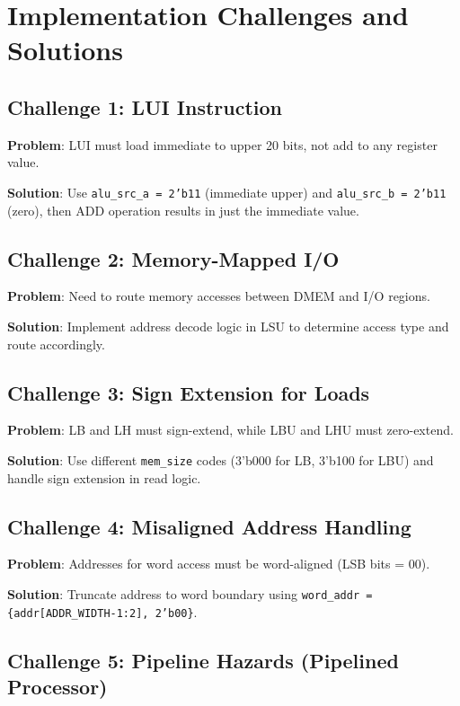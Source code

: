 \section{Implementation Challenges and Solutions}

\subsection{Challenge 1: LUI Instruction}

\textbf{Problem}: LUI must load immediate to upper 20 bits, not add to any register value.

\textbf{Solution}: Use \texttt{alu\_src\_a = 2'b11} (immediate upper) and \texttt{alu\_src\_b = 2'b11} (zero), then ADD operation results in just the immediate value.

\subsection{Challenge 2: Memory-Mapped I/O}

\textbf{Problem}: Need to route memory accesses between DMEM and I/O regions.

\textbf{Solution}: Implement address decode logic in LSU to determine access type and route accordingly.

\subsection{Challenge 3: Sign Extension for Loads}

\textbf{Problem}: LB and LH must sign-extend, while LBU and LHU must zero-extend.

\textbf{Solution}: Use different \texttt{mem\_size} codes (3'b000 for LB, 3'b100 for LBU) and handle sign extension in read logic.

\subsection{Challenge 4: Misaligned Address Handling}

\textbf{Problem}: Addresses for word access must be word-aligned (LSB bits = 00).

\textbf{Solution}: Truncate address to word boundary using \texttt{word\_addr = \{addr[ADDR\_WIDTH-1:2], 2'b00\}}.

\subsection{Challenge 5: Pipeline Hazards (Pipelined Processor)}

